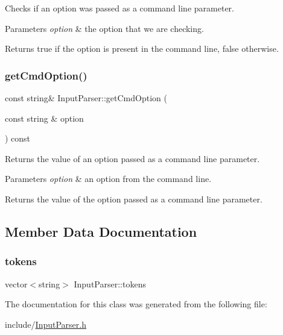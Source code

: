 Checks if an option was passed as a command line parameter. 
\begin{DoxyParams}{Parameters}
{\em option} & the option that we are checking. \\
\hline
\end{DoxyParams}
\begin{DoxyReturn}{Returns}
true if the option is present in the command line, false otherwise. 
\end{DoxyReturn}
\mbox{\label{class_input_parser_aac05d7ad7794084907a0b57ab3e7d607}} 
\subsubsection{\texorpdfstring{getCmdOption()}{getCmdOption()}}
{\footnotesize\ttfamily const string\& Input\+Parser\+::get\+Cmd\+Option (\begin{DoxyParamCaption}\item[{const string \&}]{option }\end{DoxyParamCaption}) const}

Returns the value of an option passed as a command line parameter. 
\begin{DoxyParams}{Parameters}
{\em option} & an option from the command line. \\
\hline
\end{DoxyParams}
\begin{DoxyReturn}{Returns}
the value of the option passed as a command line parameter. 
\end{DoxyReturn}


\subsection{Member Data Documentation}
\mbox{\label{class_input_parser_a4bd1105d6fc64bd0e825dc2e34515d75}} 
\subsubsection{\texorpdfstring{tokens}{tokens}}
{\footnotesize\ttfamily vector$<$string$>$ Input\+Parser\+::tokens\hspace{0.3cm}{\ttfamily [private]}}



The documentation for this class was generated from the following file\+:\begin{DoxyCompactItemize}
\item 
include/\mbox{\hyperlink{_input_parser_8h}{Input\+Parser.\+h}}\end{DoxyCompactItemize}
